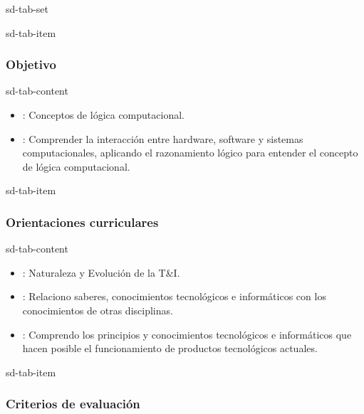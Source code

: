 \documentclass[letterpaper,10pt,spanish]{sphinxmanual}
\begin{document}
\begin{sphinxuseclass}{sd-tab-set}
\begin{sphinxuseclass}{sd-tab-item}\subsubsection*{Objetivo}

\begin{sphinxuseclass}{sd-tab-content}\begin{itemize}
\item {} 
\sphinxAtStartPar
{}: Conceptos de lógica computacional.

\item {} 
\sphinxAtStartPar
{}: Comprender la interacción entre hardware, software y sistemas computacionales, aplicando el razonamiento lógico para entender el concepto de lógica computacional.

\end{itemize}

\end{sphinxuseclass}
\end{sphinxuseclass}
\begin{sphinxuseclass}{sd-tab-item}\subsubsection*{Orientaciones curriculares}

\begin{sphinxuseclass}{sd-tab-content}\begin{itemize}
\item {} 
\sphinxAtStartPar
{}: Naturaleza y Evolución de la T\&I.

\item {} 
\sphinxAtStartPar
{}: Relaciono saberes, conocimientos tecnológicos e informáticos con los conocimientos de otras disciplinas.

\item {} 
\sphinxAtStartPar
{}: Comprendo los principios y conocimientos tecnológicos e informáticos que hacen posible el funcionamiento de productos tecnológicos actuales.

\end{itemize}

\end{sphinxuseclass}
\end{sphinxuseclass}
\begin{sphinxuseclass}{sd-tab-item}\subsubsection*{Criterios de evaluación}


\end{sphinxuseclass}
\end{sphinxuseclass}
\end{document}
